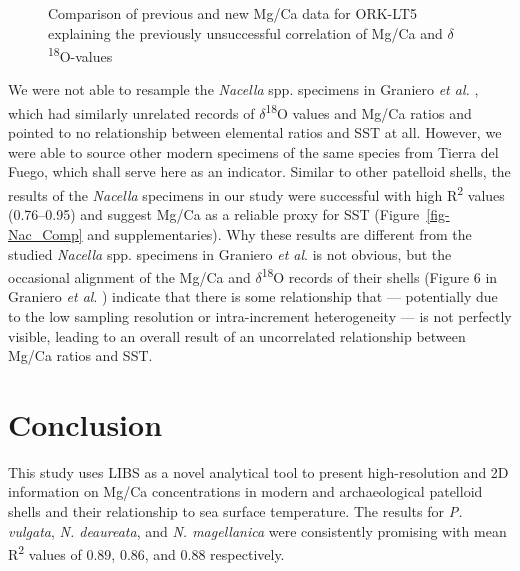 \documentclass[
  authoryear,
  preprint,
  3p]{elsarticle}
\begin{document}
\begin{figure}


\caption{\label{fig-ORK_sub}Comparison of previous and new Mg/Ca data
for ORK-LT5 explaining the previously unsuccessful correlation of Mg/Ca
and \(\delta\)\textsuperscript{18}O-values}

\end{figure}%

We were not able to resample the \emph{Nacella} spp. specimens in
Graniero \emph{et al.} \citeyearpar{Graniero2017-io}, which had
similarly unrelated records of \(\delta\)\textsuperscript{18}O values
and Mg/Ca ratios and pointed to no relationship between elemental ratios
and SST at all. However, we were able to source other modern specimens
of the same species from Tierra del Fuego, which shall serve here as an
indicator. Similar to other patelloid shells, the results of the
\emph{Nacella} specimens in our study were successful with high
R\textsuperscript{2} values (0.76--0.95) and suggest Mg/Ca as a reliable
proxy for SST (Figure~\ref{fig-Nac_Comp} and supplementaries). Why these
results are different from the studied \emph{Nacella} spp. specimens in
Graniero \emph{et al}. \citeyearpar{Graniero2017-io} is not obvious, but
the occasional alignment of the Mg/Ca and
\(\delta\)\textsuperscript{18}O records of their shells (Figure 6 in
Graniero \emph{et al}. \citeyearpar{Graniero2017-io}) indicate that
there is some relationship that --- potentially due to the low sampling
resolution or intra-increment heterogeneity --- is not perfectly
visible, leading to an overall result of an uncorrelated relationship
between Mg/Ca ratios and SST.

\section{Conclusion}\label{conclusion}

This study uses LIBS as a novel analytical tool to present
high-resolution and 2D information on Mg/Ca concentrations in modern and
archaeological patelloid shells and their relationship to sea surface
temperature. The results for \emph{P. vulgata}, \emph{N. deaureata}, and
\emph{N. magellanica} were consistently promising with mean
R\textsuperscript{2} values of 0.89, 0.86, and 0.88 respectively.
\end{document}
